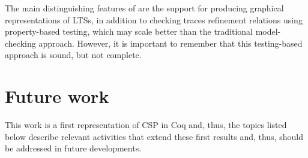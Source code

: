 The main distinguishing features of \CSPcoq{} are the support for producing graphical representations of LTSs, in addition to checking traces refinement relations using property-based testing, which may scale better than the traditional model-checking approach. However, it is important to remember that this testing-based approach is sound, but not complete.

\section{Future work}

This work is a first representation of CSP in Coq and, thus, the topics listed below describe relevant activities that extend these first results and, thus, should be addressed in future developments.

